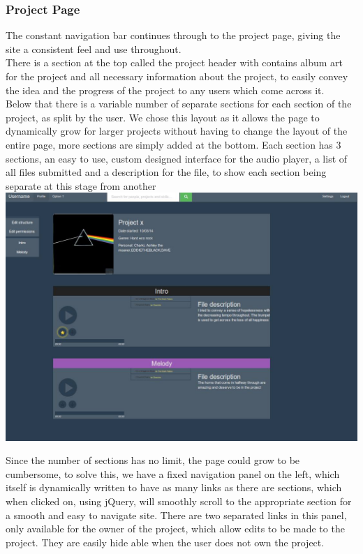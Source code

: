\documentclass{article}
\begin{document}
\subsubsection{Project Page}
The constant navigation bar continues through to the project page, giving the site a consistent feel and use throughout. \\

There is a section at the top called the project header with contains album art for the project and all necessary information about the project, to easily convey the idea and the progress of the project to any users which come across it.\\ 

Below that there is a variable number of separate sections for each section of the project, as split by the user. We chose this layout as it allows the page to dynamically grow for larger projects without having to change the layout of the entire page, more sections are simply added at the bottom. Each section has 3 sections, an easy to use, custom designed interface for the audio player, a list of all files submitted and a description for the file, to show each section being separate at this stage from another \\ 

\includegraphics[width=180mm]{2.jpg}

Since the number of sections has no limit, the page could grow to be cumbersome, to solve this, we have a fixed navigation panel on the left, which itself is dynamically written to have as many links as there are sections, which when clicked on, using jQuery, will smoothly scroll to the appropriate section for a smooth and easy to navigate site. There are two separated links in this panel, only available for the owner of the project, which allow edits to be made to the project. They are easily hide able when the user does not own the project.\\
\end{document}

